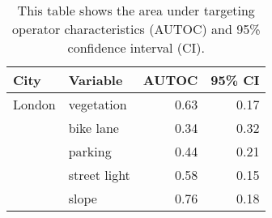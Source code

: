 \begin{table}[!htp]\centering
\caption{This table shows the area under targeting operator characteristics (AUTOC) and 95\% confidence interval (CI).}
\label{result:tab:autoc}
\scriptsize
\begin{tabular}{llrr}\toprule
City & Variable & AUTOC & 95\% CI \\\midrule
London & vegetation & 0.63 & 0.17 \\
 & bike lane & 0.34 & 0.32 \\
 & parking & 0.44 & 0.21 \\
 & street light & 0.58 & 0.15 \\
 & slope & 0.76 & 0.18 \\
\bottomrule
\end{tabular}
\end{table}
